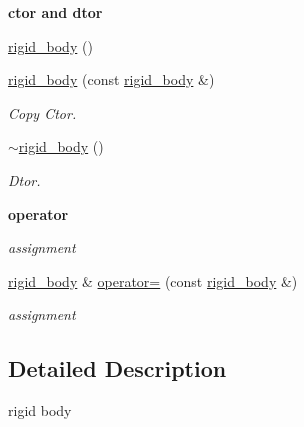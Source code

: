 \begin{Indent}{\bf ctor and dtor}\par
{\em \label{_amgrp98fbd3e5ae66fcd014fb744fec76c58d}
 }\begin{DoxyCompactItemize}
\item 
\hyperlink{classnebula_1_1content_1_1actor_1_1physics_1_1physx_1_1rigid__body_ae323aeac0f44b1721fb19dbdbe59cd4c}{rigid\_\-body} ()
\item 
\hyperlink{classnebula_1_1content_1_1actor_1_1physics_1_1physx_1_1rigid__body_a009ca3e1ac9652c731ab5099da54e758}{rigid\_\-body} (const \hyperlink{classnebula_1_1content_1_1actor_1_1physics_1_1physx_1_1rigid__body}{rigid\_\-body} \&)
\begin{DoxyCompactList}\small\item\em Copy Ctor. \item\end{DoxyCompactList}\item 
\hyperlink{classnebula_1_1content_1_1actor_1_1physics_1_1physx_1_1rigid__body_afe378b6377be61afa0caf48180175c01}{$\sim$rigid\_\-body} ()
\begin{DoxyCompactList}\small\item\em Dtor. \item\end{DoxyCompactList}\end{DoxyCompactItemize}
\end{Indent}
\begin{Indent}{\bf operator}\par
{\em \label{_amgrp4b583376b2767b923c3e1da60d10de59}
 assignment }\begin{DoxyCompactItemize}
\item 
\hyperlink{classnebula_1_1content_1_1actor_1_1physics_1_1physx_1_1rigid__body}{rigid\_\-body} \& \hyperlink{classnebula_1_1content_1_1actor_1_1physics_1_1physx_1_1rigid__body_af787176f75d680ab3ca2ad56ac64484e}{operator=} (const \hyperlink{classnebula_1_1content_1_1actor_1_1physics_1_1physx_1_1rigid__body}{rigid\_\-body} \&)
\begin{DoxyCompactList}\small\item\em assignment \item\end{DoxyCompactList}\end{DoxyCompactItemize}
\end{Indent}


\subsection{Detailed Description}
rigid body 

